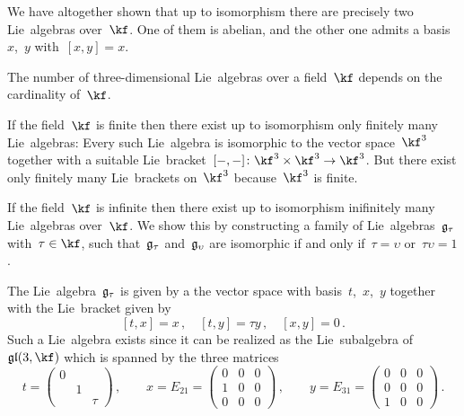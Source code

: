 \begin{example}
  We have altogether shown that up to isomorphism there are precisely two {\twodimensional} Lie~algebras over~$\kf$.
  One of them is abelian, and the other one admits a basis~$x$,~$y$ with~$[x,y] = x$.
\end{example}

\begin{example}
  \label{infinitely many three-dimensional lie algebras}
  The number of three-dimensional Lie~algebras over a field~$\kf$ depends on the cardinality of~$\kf$.

  If the field~$\kf$ is finite then there exist up to isomorphism only finitely many {\threedimensional} Lie~algebras:
  Every such Lie~algebra is isomorphic to the vector space~$\kf^3$ together with a suitable Lie~bracket~$[-,-] \colon \kf^3 \times \kf^3 \to \kf^3$.
  But there exist only finitely many Lie~brackets on~$\kf^3$ because~$\kf^3$ is finite.

  If the field~$\kf$ is infinite then there exist up to isomorphism inifinitely many Lie~algebras over~$\kf$.
  We show this by constructing a family of Lie~algebras~$\mathfrak{g}_\tau$ with~$\tau \in \kf$, such that~$\mathfrak{g}_\tau$ and~$\mathfrak{g}_\upsilon$ are isomorphic if and only if~$\tau = \upsilon$ or~$\tau \upsilon = 1$.

  The Lie~algebra~$\mathfrak{g}_\tau$ is given by a the vector space with basis~$t$,~$x$,~$y$ together with the Lie~bracket given by
  \[
    [t, x] = x \,,
    \quad
    [t, y] = \tau y \,,
    \quad
    [x, y] = 0 \,.
  \]
  Such a Lie~algebra exists since it can be realized as the Lie~subalgebra of~$\gllie(3, \kf)$ which is spanned by the three matrices
  \[
    t
    =
    \begin{pmatrix}
      0 &   &       \\
        & 1 &       \\
        &   & \tau
    \end{pmatrix} \,,
    \qquad
    x
    =
    E_{21} 
    =
    \begin{pmatrix}
      0 & 0 & 0 \\
      1 & 0 & 0 \\
      0 & 0 & 0
    \end{pmatrix} \,,
    \qquad
    y
    =
    E_{31}
    =
    \begin{pmatrix}
      0 & 0 & 0 \\
      0 & 0 & 0 \\
      1 & 0 & 0
    \end{pmatrix} \,.
  \]


\end{example}

